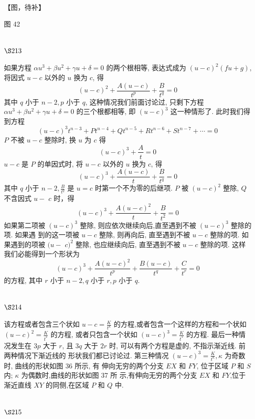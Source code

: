 【图，待补】

图 42

\section{$\S 213$}

如果方程 $\alpha u^{3}+\beta u^{2}+\gamma u+\delta=0$ 的两个根相等, 表达式成为 $(u-c)^{2}(f u+g)$, 将因式 $u-c$ 以外的 $u$ 换为 $c$, 得
\[
(u-c)^{2}+\frac{A(u-c)}{t^{p}}+\frac{B}{t^{q}}=0
\]
其中 $q$ 小于 $n-2, p$ 小于 $q$, 这种情况我们前面讨论过, 只剩下方程 $\alpha u^{3}+\beta u^{2}+\gamma u+\delta=0$ 的三个根都相等, 即 $(u-c)^{3}$ 这一种情形了. 此时我们得到方程
\[
(u-c)^{3} t^{n-3}+P t^{n-4}+Q t^{n-5}+R t^{n-6}+S t^{n-7}+\cdots=0
\]
$P$ 不被 $u-c$ 整除时, 换 $u$ 为 $c$ 得
\[
(u-c)^{3}+\frac{A}{t}=0
\]
$u-c$ 是 $P$ 的单因式时, 将 $u-c$ 以外的 $u$ 换为 $c$, 得
\[
(u-c)^{3}+\frac{A(u-c)}{t}+\frac{B}{t^{q}}=0
\]
其中 $q$ 小于 $n-2, \frac{B}{t^{q}}$ 是 $u=c$ 时第一个不为零的后继项. $P$ 被 $(u-c)^{2}$ 整除, $Q$ 不含因式 $u-$ $c$ 时，得
\[
(u-c)^{3}+\frac{A(u-c)^{2}}{t}+\frac{B}{t^{2}}=0
\]
如果第二项被 $(u-c)^{3}$ 整除, 则应依次继续向后,直至遇到不被 $(u-c)^{3}$ 整除的项. 如果遇 到的这一项被 $u-c$ 整除, 则再向后, 直至遇到不被 $u-c$ 整除的项. 如果遇到的项被 $(u-$ $c)^{2}$ 整除, 也应继续向后, 直至遇到不被 $u-c$ 整除的项. 这样我们必能得到一个形状为
\[
(u-c)^{3}+\frac{A(u-c)^{2}}{t^{p}}+\frac{B(u-c)}{t^{q}}+\frac{C}{t^{r}}=0
\]
的方程, 其中 $r$ 小于 $n-2, q$ 小于 $r, p$ 小于 $q$.

\section{$\S 214$}

该方程或者包含三个状如 $u-c=\frac{K}{t^{\kappa}}$ 的方程,或者包含一个这样的方程和一个状如 $(u-c)^{2}=\frac{K}{t^{*}}$ 的方程, 或者只包含一个状如 $(u-c)^{3}=\frac{K}{t^{*}}$ 的方程. 最后一种情况发生在 $3 p$ 大于 $r$, 且 $3 q$ 大于 $2 r$ 时, 可以有两个方程是虚的, 不指示渐近线. 前两种情况下渐近线的 形状我们都已讨论过. 第三种情况 $(u-c)^{3}=\frac{K}{t^{\kappa}}, \kappa$ 为奇数时, 曲线的形状如图 36 所示, 有 伸向无穷的两个分支 $E X$ 和 $F Y$, 位于区域 $P$ 和 $S$ 内; $\kappa$ 为偶数时,曲线的形状如图 37 所 示,有伸向无穷的两个分支 $E X$ 和 $F Y$,位于渐近直线 $X Y$ 的同侧,在区域 $P$ 和 $Q$ 中.

\section{$\S 215$}

